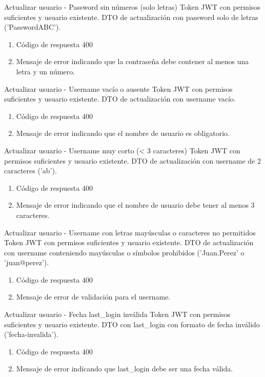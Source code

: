 {Actualizar usuario - Password sin números (solo letras)}
{Token JWT con permisos suficientes y usuario existente.}
{DTO de actualización con password solo de letras ('PasswordABC').}
{\begin{enumerate} [leftmargin=*, nosep]
    \item Código de respuesta 400
    \item Mensaje de error indicando que la contraseña debe contener al menos una letra y un número.
\end{enumerate}}

{Actualizar usuario - Username vacío o ausente}
{Token JWT con permisos suficientes y usuario existente.}
{DTO de actualización con username vacío.}
{\begin{enumerate} [leftmargin=*, nosep]
    \item Código de respuesta 400
    \item Mensaje de error indicando que el nombre de usuario es obligatorio.
\end{enumerate}}

{Actualizar usuario - Username muy corto (< 3 caracteres)}
{Token JWT con permisos suficientes y usuario existente.}
{DTO de actualización con username de 2 caracteres ('ab').}
{\begin{enumerate} [leftmargin=*, nosep]
    \item Código de respuesta 400
    \item Mensaje de error indicando que el nombre de usuario debe tener al menos 3 caracteres.
\end{enumerate}}

{Actualizar usuario - Username con letras mayúsculas o caracteres no permitidos}
{Token JWT con permisos suficientes y usuario existente.}
{DTO de actualización con username conteniendo mayúsculas o símbolos prohibidos ('Juan.Perez' o 'juan@perez').}
{\begin{enumerate} [leftmargin=*, nosep]
    \item Código de respuesta 400
    \item Mensaje de error de validación para el username.
\end{enumerate}}

{Actualizar usuario - Fecha last\_login inválida}
{Token JWT con permisos suficientes y usuario existente.}
{DTO con last\_login con formato de fecha inválido ('fecha-invalida').}
{\begin{enumerate} [leftmargin=*, nosep]
    \item Código de respuesta 400
    \item Mensaje de error indicando que last\_login debe ser una fecha válida.
\end{enumerate}}

